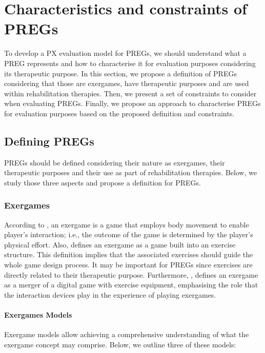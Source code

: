 \chapter{Characteristics and constraints of \acp{PREG}}
\label{ch:characterising}

To develop a \ac{PX} evaluation model for \acp{PREG}, we should understand what a \ac{PREG} represents and how to characterise it for evaluation purposes considering its therapeutic purpose. In this section, we propose a definition of \acp{PREG} considering that those are exergames, have therapeutic purposes and are used within rehabilitation therapies. Then, we present a set of constraints to consider when evaluating \acp{PREG}. Finally, we propose an approach to characterise \acp{PREG} for evaluation purposes based on the proposed definition and constraints.

\section{Defining \acp{PREG}} %
\label{sec:def_reh_ex}
\acp{PREG} should be defined considering their nature as exergames, their therapeutic purposes and their use as part of rehabilitation therapies. Below, we study those three aspects and propose a definition for \acp{PREG}.

\subsection{Exergames}
\label{sub:def_ex}
According to \textcite{Mueller2011}, an exergame is a game that employs body movement to enable player's interaction; i.e., the outcome of the game is determined by the player's physical effort. Also, \textcite{Pirovano2016} defines an exergame as a game built into an exercise structure. This definition implies that the associated exercises should guide the whole game design process. It may be important for \acp{PREG} since exercises are directly related to their therapeutic purpose. Furthermore, \textcite{Sinclair2009}, defines an exergame as a merger of a digital game with exercise equipment, emphasising the role that the interaction devices play in the experience of playing exergames.

\subsubsection{Exergames Models}
\label{subsub:eg_models}
Exergame models allow achieving a comprehensive understanding of what the exergame concept may comprise. Below, we outline three of these models:

